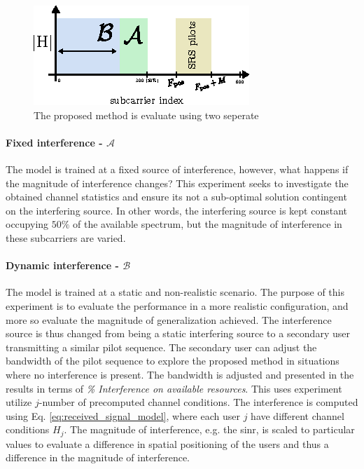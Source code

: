 \begin{figure}
    \centering
    \includegraphics{chapters/part_uplink/figures/subcarrier_index_experiment_setup.eps}
    \caption{The proposed method is evaluate using two seperate }
    \label{fig:subcarrier_index_experiment}
\end{figure}

\paragraph{Fixed interference - $\mathcal{A}$}
The model is trained at a fixed source of interference, however, what happens if the magnitude of interference changes? This experiment seeks to investigate the obtained channel statistics and ensure its not a sub-optimal solution contingent on the interfering source. In other words, the interfering source is kept constant occupying $50\%$ of the available spectrum, but the magnitude of interference in these subcarriers are varied.

\paragraph{Dynamic interference - $\mathcal{B}$}
The model is trained at a static and non-realistic scenario. The purpose of this experiment is to evaluate the performance in a more realistic configuration, and more so evaluate the magnitude of generalization achieved. The interference source is thus changed from being a static interfering source to a secondary user transmitting a similar pilot sequence. The secondary user can adjust the bandwidth of the pilot sequence to explore the proposed method in situations where no interference is present. The bandwidth is adjusted and presented in the results in terms of \emph{\% Interference on available resources}. This uses experiment utilize $j$-number of precomputed channel conditions. The interference is computed using Eq. \ref{eq:received_signal_model}, where each user $j$ have different channel conditions $H_j$. The magnitude of interference, e.g. the \gls{sinr}, is scaled to particular values to evaluate a difference in spatial positioning of the users and thus a difference in the magnitude of interference.


